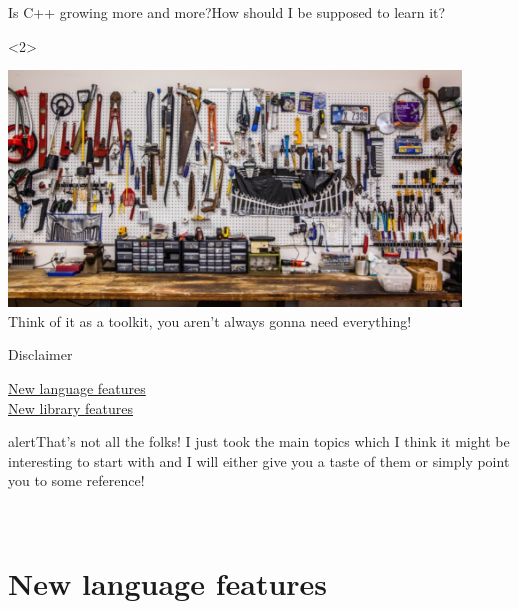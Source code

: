 \documentclass[usenames,dvipsnames,svgnames,14pt]{beamer}
\begin{document}
    \begin{frame}{Is C++ growing more and more?}{How should I be supposed to learn it?}
        \begin{uncoverenv}<2>
            \begin{center}
                \includegraphics[width=0.9\textwidth]{Toolkit}\\[1mm]
                Think of it as a toolkit, you aren't always gonna need everything!
            \end{center}
        \end{uncoverenv}
    \end{frame}
    \begin{frame}{Disclaimer}
        \vspace{-3mm}
        \centering
        \begin{center}
            \hyperlink{P1}{ New language features}\\[3mm]
            \hyperlink{P2}{ New library features}
        \end{center}
        \begin{varblock}{alert}{That's not all the folks!}
            I just took the main topics which I think it might be interesting to start with and I will either give you a taste of them or simply point you to some reference!
        \end{varblock}
        \bigskip
        \\[3mm]
    \end{frame}
    \label{P1}
    \part{New language features}
    
    \label{P2}
\end{document}
